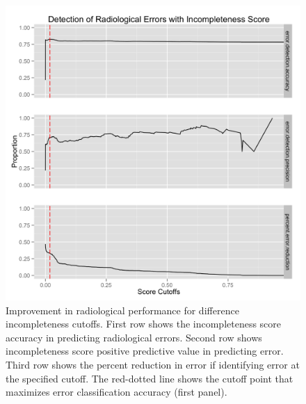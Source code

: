 \begin{figure}
\centering
\includegraphics[width=\linewidth]{figures/incompleteness_rad_improvement}
\caption{Improvement in radiological performance for difference incompleteness cutoffs. First row shows the incompleteness score accuracy in predicting radiological errors. Second row shows incompleteness score positive predictive value in predicting error. Third row shows the percent reduction in error if identifying error at the specified cutoff. The red-dotted line shows the cutoff point that maximizes error classification accuracy (first panel).}
\label{fig:incompleteness_rad_improvement}
\end{figure}
